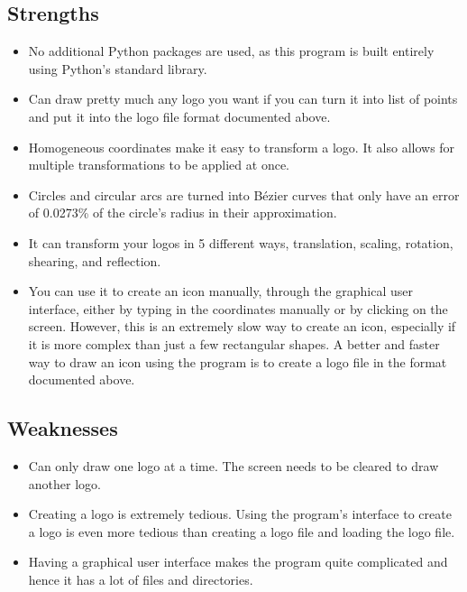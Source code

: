 \documentclass[11pt]{article}
\begin{document}
\subsection{Strengths}
\label{sec:orgd5cfedb}
\begin{itemize}
\item No additional Python packages are used, as this program is built entirely using Python's standard library.
\item Can draw pretty much any logo you want if you can turn it into list of points and put it into the logo file format documented above.
\item Homogeneous coordinates make it easy to transform a logo. It also allows for multiple transformations to be applied at once.
\item Circles and circular arcs are turned into Bézier curves that only have an error of 0.0273\% of the circle's radius in their approximation.
\item It can transform your logos in 5 different ways, translation, scaling, rotation, shearing, and reflection.
\item You can use it to create an icon manually, through the graphical user interface, either by typing in the coordinates manually or by clicking on the screen. However, this is an extremely slow way to create an icon, especially if it is more complex than just a few rectangular shapes. A better and faster way to draw an icon using the program is to create a logo file in the format documented above.
\end{itemize}

\subsection{Weaknesses}
\label{sec:orgd2630a3}
\begin{itemize}
\item Can only draw one logo at a time. The screen needs to be cleared to draw another logo.
\item Creating a logo is extremely tedious. Using the program's interface to create a logo is even more tedious than creating a logo file and loading the logo file.
\item Having a graphical user interface makes the program quite complicated and hence it has a lot of files and directories.
\end{itemize}

 \newpage
\end{document}
